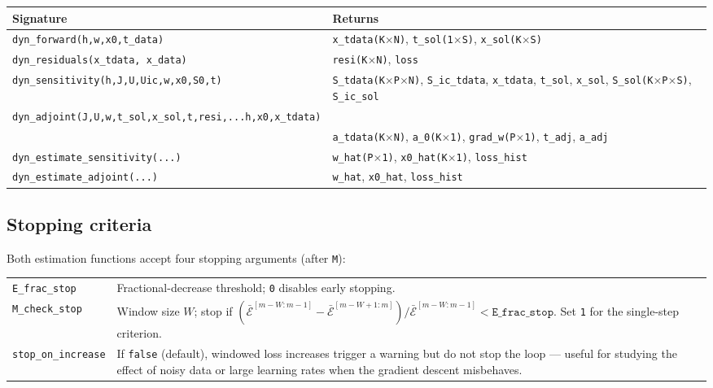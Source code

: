 \documentclass[10pt]{article}
\begin{document}
	\begin{tabular}{@{}L{7.5cm}L{7.8cm}@{}}
		\toprule
		Signature & Returns \\
		\midrule
		\texttt{dyn\_forward(h,w,x0,t\_data)} &
		\texttt{x\_tdata(K$\times$N)}, \texttt{t\_sol(1$\times$S)}, \texttt{x\_sol(K$\times$S)} \\
		\texttt{dyn\_residuals(x\_tdata, x\_data)} &
		\texttt{resi(K$\times$N)}, \texttt{loss} \\
		\texttt{dyn\_sensitivity(h,J,U,Uic,w,x0,S0,t)} &
		\texttt{S\_tdata(K$\times$P$\times$N)}, \texttt{S\_ic\_tdata}, \texttt{x\_tdata}, \texttt{t\_sol}, \texttt{x\_sol}, \texttt{S\_sol(K$\times$P$\times$S)}, \texttt{S\_ic\_sol} \\
		\texttt{dyn\_adjoint(J,U,w,t\_sol,x\_sol,t,resi,...h,x0,x\_tdata)} & \\ %
		& 
		\texttt{a\_tdata(K$\times$N)}, \texttt{a\_0(K$\times$1)}, \texttt{grad\_w(P$\times$1)}, \texttt{t\_adj}, \texttt{a\_adj} \\
		\texttt{dyn\_estimate\_sensitivity(...)} &
		\texttt{w\_hat(P$\times$1)}, \texttt{x0\_hat(K$\times$1)}, \texttt{loss\_hist} \\
		\texttt{dyn\_estimate\_adjoint(...)} &
		\texttt{w\_hat}, \texttt{x0\_hat}, \texttt{loss\_hist} \\
		\bottomrule
	\end{tabular}
	
	\subsection{Stopping criteria}
	
	Both estimation functions accept four stopping arguments (after \texttt{M}):
	
	\medskip
	\begin{tabular}{@{}L{3.5cm}L{9.8cm}@{}}
		\texttt{E\_frac\_stop} & Fractional-decrease threshold; \texttt{0} disables early stopping. \\
		\texttt{M\_check\_stop} & Window size $W$; stop if
		$(\bar{\mathcal{E}}^{[m-W:m-1]}-\bar{\mathcal{E}}^{[m-W+1:m]})/\bar{\mathcal{E}}^{[m-W:m-1]} < \texttt{E\_frac\_stop}$.
		Set \texttt{1} for the single-step criterion. \\
		\texttt{stop\_on\_increase} & If \texttt{false} (default), windowed loss
		increases trigger a warning but do not stop the loop — useful for
		studying the effect of noisy data or large learning rates when the gradient descent misbehaves. \\
	\end{tabular}
	
\end{document}
